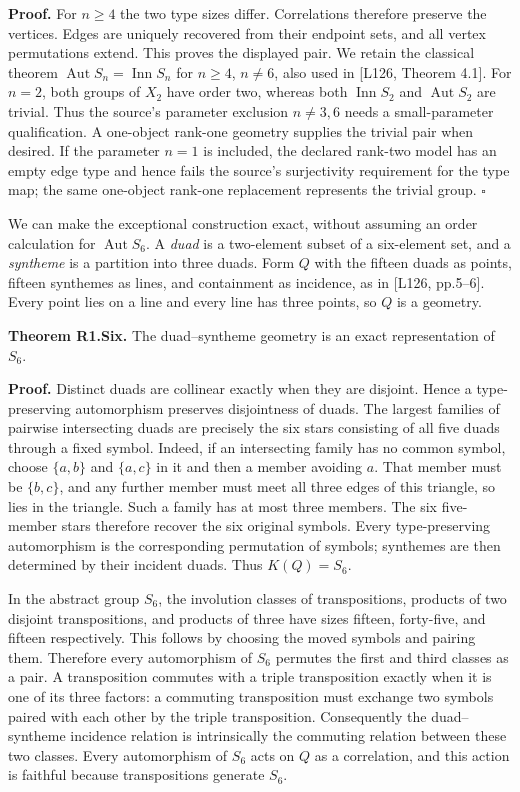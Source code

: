 \textbf{Proof.} For \(n\ge4\) the two type sizes differ. Correlations
therefore preserve the vertices. Edges are uniquely recovered from their
endpoint sets, and all vertex permutations extend. This proves the
displayed pair. We retain the classical theorem
\(\operatorname{Aut}S_n=\operatorname{Inn}S_n\) for \(n\ge4\),
\(n\ne6\), also used in {[}L126, Theorem 4.1{]}. For \(n=2\), both
groups of \(X_2\) have order two, whereas both \(\operatorname{Inn}S_2\)
and \(\operatorname{Aut}S_2\) are trivial. Thus the source's parameter
exclusion \(n\ne3,6\) needs a small-parameter qualification. A
one-object rank-one geometry supplies the trivial pair when desired.
If the parameter $n=1$ is included, the declared rank-two model has an
empty edge type and hence fails the source's surjectivity requirement
for the type map; the same one-object rank-one replacement represents
the trivial group.
\(\square\)

We can make the exceptional construction exact, without assuming an
order calculation for \(\operatorname{Aut}S_6\). A \emph{duad} is a
two-element subset of a six-element set, and a \emph{syntheme} is a
partition into three duads. Form \(Q\) with the fifteen duads as points,
fifteen synthemes as lines, and containment as incidence, as in {[}L126,
pp.5--6{]}. Every point lies on a line and every line has three points,
so \(Q\) is a geometry.

\textbf{Theorem R1.Six.} The duad--syntheme geometry is an exact
representation of \(S_6\).

\textbf{Proof.} Distinct duads are collinear exactly when they are
disjoint. Hence a type-preserving automorphism preserves disjointness of
duads. The largest families of pairwise intersecting duads are precisely
the six stars consisting of all five duads through a fixed symbol.
Indeed, if an intersecting family has no common symbol, choose
\(\{a,b\}\) and \(\{a,c\}\) in it and then a member avoiding \(a\). That
member must be \(\{b,c\}\), and any further member must meet all three
edges of this triangle, so lies in the triangle. Such a family has at
most three members. The six five-member stars therefore recover the six
original symbols. Every type-preserving automorphism is the
corresponding permutation of symbols; synthemes are then determined by
their incident duads. Thus \(K(Q)=S_6\).

In the abstract group \(S_6\), the involution classes of transpositions,
products of two disjoint transpositions, and products of three have
sizes fifteen, forty-five, and fifteen respectively. This follows by
choosing the moved symbols and pairing them. Therefore every
automorphism of \(S_6\) permutes the first and third classes as a pair.
A transposition commutes with a triple transposition exactly when it is
one of its three factors: a commuting transposition must exchange two
symbols paired with each other by the triple transposition. Consequently
the duad--syntheme incidence relation is intrinsically the commuting
relation between these two classes. Every automorphism of \(S_6\) acts
on \(Q\) as a correlation, and this action is faithful because
transpositions generate \(S_6\).

